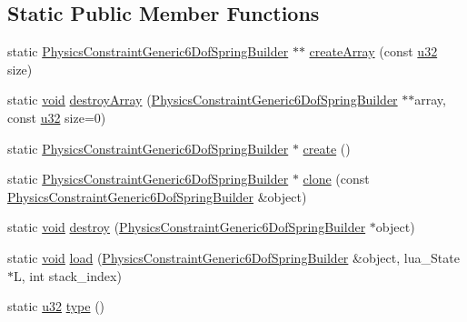 \subsection*{Static Public Member Functions}
\begin{DoxyCompactItemize}
\item 
static \mbox{\hyperlink{classnjli_1_1_physics_constraint_generic6_dof_spring_builder}{Physics\+Constraint\+Generic6\+Dof\+Spring\+Builder}} $\ast$$\ast$ \mbox{\hyperlink{classnjli_1_1_physics_constraint_generic6_dof_spring_builder_a85e7ce26bf8b5217dc8ba1d5431bd5e9}{create\+Array}} (const \mbox{\hyperlink{_util_8h_a10e94b422ef0c20dcdec20d31a1f5049}{u32}} size)
\item 
static \mbox{\hyperlink{_thread_8h_af1e856da2e658414cb2456cb6f7ebc66}{void}} \mbox{\hyperlink{classnjli_1_1_physics_constraint_generic6_dof_spring_builder_a485a6bf0d55a3a9f548551373bb09fb4}{destroy\+Array}} (\mbox{\hyperlink{classnjli_1_1_physics_constraint_generic6_dof_spring_builder}{Physics\+Constraint\+Generic6\+Dof\+Spring\+Builder}} $\ast$$\ast$array, const \mbox{\hyperlink{_util_8h_a10e94b422ef0c20dcdec20d31a1f5049}{u32}} size=0)
\item 
static \mbox{\hyperlink{classnjli_1_1_physics_constraint_generic6_dof_spring_builder}{Physics\+Constraint\+Generic6\+Dof\+Spring\+Builder}} $\ast$ \mbox{\hyperlink{classnjli_1_1_physics_constraint_generic6_dof_spring_builder_af08040617decc3acd3212930415ae131}{create}} ()
\item 
static \mbox{\hyperlink{classnjli_1_1_physics_constraint_generic6_dof_spring_builder}{Physics\+Constraint\+Generic6\+Dof\+Spring\+Builder}} $\ast$ \mbox{\hyperlink{classnjli_1_1_physics_constraint_generic6_dof_spring_builder_a182e21f1591ca26e4b124a03f6678de0}{clone}} (const \mbox{\hyperlink{classnjli_1_1_physics_constraint_generic6_dof_spring_builder}{Physics\+Constraint\+Generic6\+Dof\+Spring\+Builder}} \&object)
\item 
static \mbox{\hyperlink{_thread_8h_af1e856da2e658414cb2456cb6f7ebc66}{void}} \mbox{\hyperlink{classnjli_1_1_physics_constraint_generic6_dof_spring_builder_a66c67a6cb1e2b3277a92f0d4704767bc}{destroy}} (\mbox{\hyperlink{classnjli_1_1_physics_constraint_generic6_dof_spring_builder}{Physics\+Constraint\+Generic6\+Dof\+Spring\+Builder}} $\ast$object)
\item 
static \mbox{\hyperlink{_thread_8h_af1e856da2e658414cb2456cb6f7ebc66}{void}} \mbox{\hyperlink{classnjli_1_1_physics_constraint_generic6_dof_spring_builder_ada9dae397a8a580d1d13adfe0e5bdfc2}{load}} (\mbox{\hyperlink{classnjli_1_1_physics_constraint_generic6_dof_spring_builder}{Physics\+Constraint\+Generic6\+Dof\+Spring\+Builder}} \&object, lua\+\_\+\+State $\ast$L, int stack\+\_\+index)
\item 
static \mbox{\hyperlink{_util_8h_a10e94b422ef0c20dcdec20d31a1f5049}{u32}} \mbox{\hyperlink{classnjli_1_1_physics_constraint_generic6_dof_spring_builder_abadc19b66e278a4dcc7b7d3d2bb2df42}{type}} ()
\end{DoxyCompactItemize}
